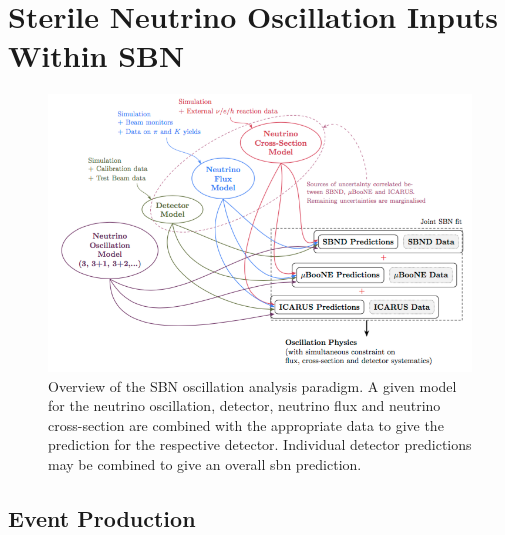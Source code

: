 \chapter{Sterile Neutrino Oscillation Inputs Within SBN}
\label{chap:osc_inputs}


\begin{figure}[!h]
    \centering
    \includegraphics[width = \largefigwidth]{figures-chap5/valor_analysis.png}
    \caption{Overview of the SBN oscillation analysis paradigm. A given model for the neutrino oscillation, detector, neutrino flux and neutrino cross-section are combined with the appropriate data to give the prediction for the respective detector. Individual detector predictions may be combined to give an overall \gls{sbn} prediction. }
    \label{fig:analysis_paradigm}
\end{figure}

\section{Event Production}


\subsection{\texorpdfstring{\numu}{numu}}
